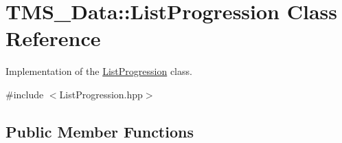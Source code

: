 \hypertarget{classTMS__Data_1_1ListProgression}{
\section{TMS\_\-Data::ListProgression Class Reference}
\label{classTMS__Data_1_1ListProgression}
}


Implementation of the \hyperlink{classTMS__Data_1_1ListProgression}{ListProgression} class.  




{\ttfamily \#include $<$ListProgression.hpp$>$}

\subsection*{Public Member Functions}
